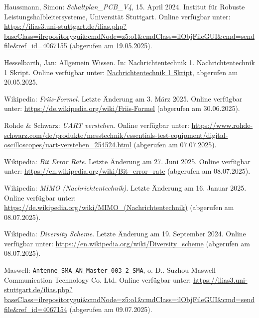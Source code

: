 \begin{thebibliography}{1}

Haussmann, Simon: \emph{Schaltplan\_PCB\_V4}, 15. April 2024. Institut für Robuste Leistungshalbleitersysteme, Universität Stuttgart. Online verfügbar unter: \url{https://ilias3.uni-stuttgart.de/ilias.php?baseClass=ilrepositorygui&cmdNode=z5:o1&cmdClass=ilObjFileGUI&cmd=sendfile&ref_id=4067155} (abgerufen am 19.05.2025).

Hesselbarth, Jan: Allgemein Wissen. In: Nachrichtentechnik 1. Nachrichtentechnik 1 Skript. Online verfügbar unter: \url{Nachrichtentechnik 1 Skript}, abgerufen am 20.05.2025.

Wikipedia: \emph{Friis-Formel}. Letzte Änderung am 3. März 2025.  
Online verfügbar unter: \url{https://de.wikipedia.org/wiki/Friis-Formel} (abgerufen am 30.06.2025).

Rohde \& Schwarz: \emph{UART verstehen}. Online verfügbar unter: \url{https://www.rohde-schwarz.com/de/produkte/messtechnik/essentials-test-equipment/digital-oscilloscopes/uart-verstehen_254524.html} (abgerufen am 07.07.2025).

Wikipedia: \emph{Bit Error Rate}. Letzte Änderung am 27. Juni 2025.  
Online verfügbar unter: \url{https://en.wikipedia.org/wiki/Bit_error_rate} (abgerufen am 08.07.2025).

Wikipedia: \emph{MIMO (Nachrichtentechnik)}. Letzte Änderung am 16. Januar 2025.  
Online verfügbar unter: \url{https://de.wikipedia.org/wiki/MIMO_(Nachrichtentechnik)} (abgerufen am 08.07.2025).

Wikipedia: \emph{Diversity Scheme}. Letzte Änderung am 19. September 2024.
Online verfügbar unter: \url{https://en.wikipedia.org/wiki/Diversity_scheme} (abgerufen am 08.07.2025).

Maswell: \texttt{Antenne\_SMA\_AN\_Master\_003\_2\_SMA}, o. D.. Suzhou Maswell Communication Technology Co. Ltd. Online verfügbar unter: \url{https://ilias3.uni-stuttgart.de/ilias.php?baseClass=ilrepositorygui&cmdNode=z5:o1&cmdClass=ilObjFileGUI&cmd=sendfile&ref_id=4067154} (abgerufen am 09.07.2025).

\end{thebibliography}

\clearpage
